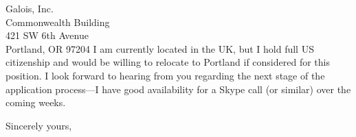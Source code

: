 \documentclass[11pt]{letter} %
\begin{document}
\begin{letter}{ Galois, Inc. \\
Commonwealth Building \\
421 SW 6th Avenue \\
Portland, OR 97204}
I am currently located in the UK, but I hold full US citizenship and would be
willing to relocate to Portland if considered for this position. I look forward
to hearing from you regarding the next stage of the application process---I have
good availability for a Skype call (or similar) over the coming weeks.

\closing{Sincerely yours,}




\end{letter}
\end{document}
